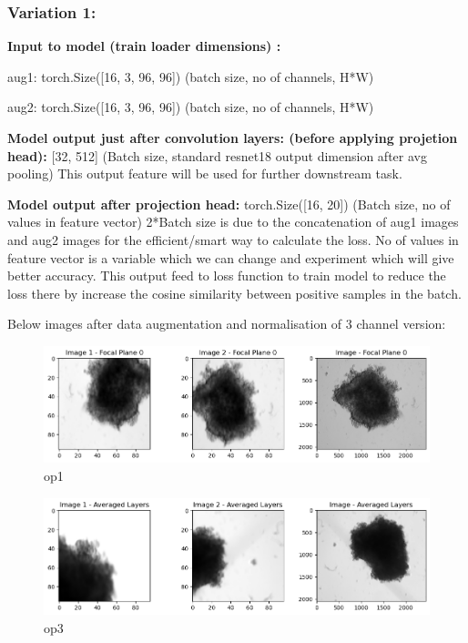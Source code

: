 \documentclass[12pt,twoside,a4paper,parskip]{scrbook} %
\begin{document}
\subsubsection{Variation 1:}
\textbf{Input to model (train loader dimensions) :} 

  aug1: torch.Size([16, 3, 96, 96])        (batch size, no of channels, H*W)

  aug2: torch.Size([16, 3, 96, 96])        (batch size, no of channels, H*W)

  \textbf{Model output just after convolution layers: (before applying projetion head):} [32, 512]  (Batch size, standard resnet18 output dimension after avg pooling)   This output feature will be used for further downstream task.

  \textbf{Model output after projection head:} torch.Size([16, 20]) (Batch size, no of values in feature vector) 2*Batch size is due to the concatenation of aug1 images and aug2 images for the efficient/smart way to calculate the loss. No of values in feature vector is a variable which we can change and experiment which will give better accuracy. This output feed to loss function to train model to reduce the loss there by increase the cosine similarity between positive samples in the batch.
   
  Below images after data augmentation and normalisation of 3 channel version:

  \begin{figure}[H]
    \centering
    \includegraphics[width=0.9\linewidth]{figures/op1.png} %
    \caption{op1}
    \label{fig:out_2}
  \end{figure}

  \begin{figure}[H]
    \centering
    \includegraphics[width=0.9\linewidth]{figures/output3.png} %
    \caption{op3}
    \label{fig:output3}
  \end{figure}
\end{document}
